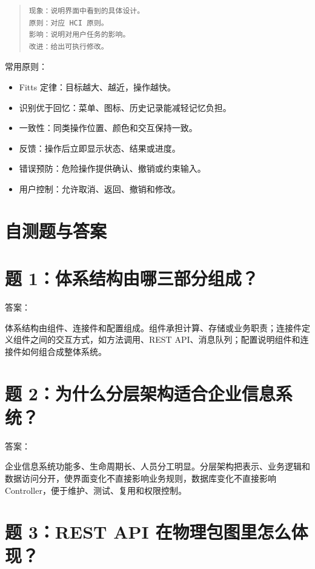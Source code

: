 \documentclass[UTF8,zihao=-4]{ctexart}
\begin{document}
\begin{quote}
\footnotesize
\begin{verbatim}
现象：说明界面中看到的具体设计。
原则：对应 HCI 原则。
影响：说明对用户任务的影响。
改进：给出可执行修改。
\end{verbatim}
\end{quote}

常用原则：

\begin{itemize}
\item Fitts 定律：目标越大、越近，操作越快。
\item 识别优于回忆：菜单、图标、历史记录能减轻记忆负担。
\item 一致性：同类操作位置、颜色和交互保持一致。
\item 反馈：操作后立即显示状态、结果或进度。
\item 错误预防：危险操作提供确认、撤销或约束输入。
\item 用户控制：允许取消、返回、撤销和修改。
\end{itemize}

\section{自测题与答案}

\section{题 1：体系结构由哪三部分组成？}

答案：

体系结构由组件、连接件和配置组成。组件承担计算、存储或业务职责；连接件定义组件之间的交互方式，如方法调用、REST API、消息队列；配置说明组件和连接件如何组合成整体系统。

\section{题 2：为什么分层架构适合企业信息系统？}

答案：

企业信息系统功能多、生命周期长、人员分工明显。分层架构把表示、业务逻辑和数据访问分开，使界面变化不直接影响业务规则，数据库变化不直接影响 Controller，便于维护、测试、复用和权限控制。

\section{题 3：REST API 在物理包图里怎么体现？}
\end{document}
